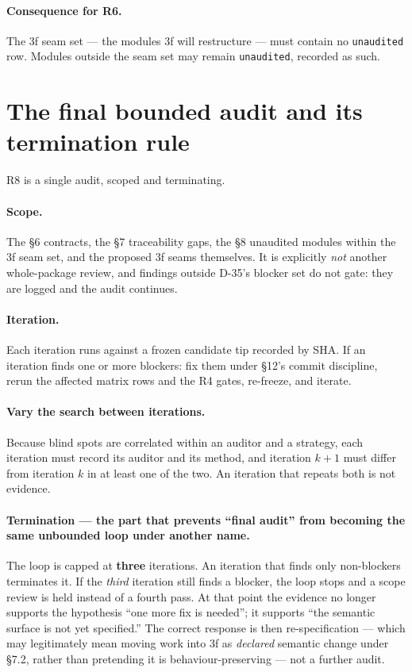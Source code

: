 \documentclass[11pt]{article}
\renewcommand{\tt}[1]{\texttt{#1}}
\newenvironment{ruling}{\begin{leftbar}\small}{\end{leftbar}}
\begin{document}
\paragraph{Consequence for R6.} The 3f seam set --- the modules 3f will restructure ---
must contain no \tt{unaudited} row. Modules outside the seam set may remain
\tt{unaudited}, recorded as such.

\section{The final bounded audit and its termination rule}

R8 is a single audit, scoped and terminating.

\paragraph{Scope.} The \S6 contracts, the \S7 traceability gaps, the \S8 unaudited
modules within the 3f seam set, and the proposed 3f seams themselves. It is explicitly
\emph{not} another whole-package review, and findings outside D-35's blocker set do not
gate: they are logged and the audit continues.

\paragraph{Iteration.} Each iteration runs against a frozen candidate tip recorded by SHA.
If an iteration finds one or more blockers: fix them under \S12's commit discipline, rerun
the affected matrix rows and the R4 gates, re-freeze, and iterate.

\paragraph{Vary the search between iterations.} Because blind spots are correlated within
an auditor and a strategy, each iteration must record its auditor and its method, and
iteration $k+1$ must differ from iteration $k$ in at least one of the two. An iteration
that repeats both is not evidence.

\paragraph{Termination --- the part that prevents ``final audit'' from becoming the same
unbounded loop under another name.}

\begin{ruling}
\noindent The loop is capped at \textbf{three} iterations. An iteration that finds only
non-blockers terminates it. If the \emph{third} iteration still finds a blocker, the loop
stops and a scope review is held instead of a fourth pass. At that point the evidence no
longer supports the hypothesis ``one more fix is needed''; it supports ``the semantic
surface is not yet specified.'' The correct response is then re-specification --- which
may legitimately mean moving work into 3f as \emph{declared} semantic change under \S7.2,
rather than pretending it is behaviour-preserving --- not a further audit.
\end{ruling}
\end{document}
